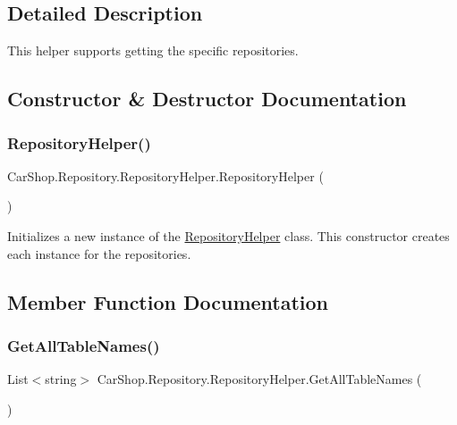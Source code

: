 \subsection{Detailed Description}
This helper supports getting the specific repositories. 



\subsection{Constructor \& Destructor Documentation}
\mbox{\label{class_car_shop_1_1_repository_1_1_repository_helper_ab5aa4d9a33d9b1859e1a4ab5aa4ab974}} 
\subsubsection{\texorpdfstring{Repository\+Helper()}{RepositoryHelper()}}
{\footnotesize\ttfamily Car\+Shop.\+Repository.\+Repository\+Helper.\+Repository\+Helper (\begin{DoxyParamCaption}{ }\end{DoxyParamCaption})}



Initializes a new instance of the \mbox{\hyperlink{class_car_shop_1_1_repository_1_1_repository_helper}{Repository\+Helper}} class. This constructor creates each instance for the repositories. 



\subsection{Member Function Documentation}
\mbox{\label{class_car_shop_1_1_repository_1_1_repository_helper_abe7dec93c7555aa6630f7212ca2dd714}} 
\subsubsection{\texorpdfstring{Get\+All\+Table\+Names()}{GetAllTableNames()}}
{\footnotesize\ttfamily List$<$string$>$ Car\+Shop.\+Repository.\+Repository\+Helper.\+Get\+All\+Table\+Names (\begin{DoxyParamCaption}{ }\end{DoxyParamCaption})}



